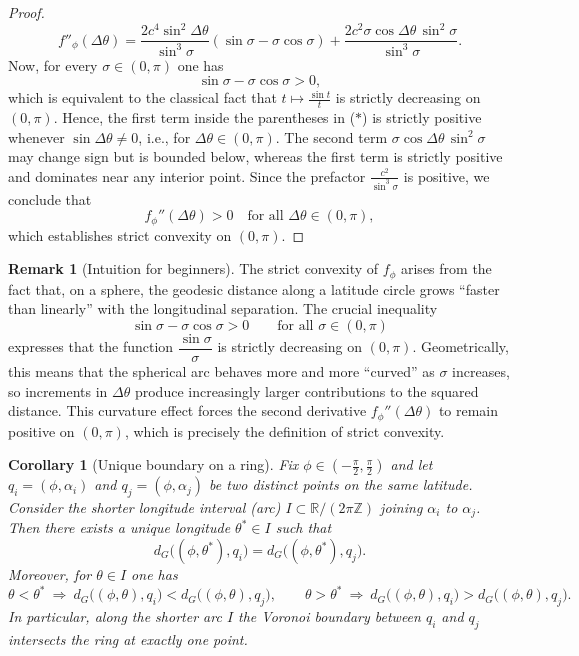 \documentclass[12pt, reqno]{amsart}
\theoremstyle{plain}
\newtheorem{corollary}[subsection]{Corollary}
\theoremstyle{definition}
\newtheorem{remark}[subsection]{Remark}
\begin{document}
\begin{proof}
\begin{equation}
f''_\phi(\Delta\theta)
=
\frac{2c^{4}\sin^{2}\Delta\theta}{\sin^{3}\sigma}
(\sin\sigma - \sigma\cos\sigma)
+
\frac{2c^{2}\sigma\cos\Delta\theta\,\sin^{2}\sigma}{\sin^{3}\sigma}.
\tag{$\ast$}
\end{equation}
 Now, for every $\sigma \in (0,\pi)$ one has
\[
\sin\sigma - \sigma\cos\sigma > 0,
\]
which is equivalent to the classical fact that $t \mapsto \frac{\sin t}{t}$ is strictly decreasing on $(0,\pi)$.
Hence, the first term inside the parentheses in \textup{($\ast$)} is strictly positive whenever $\sin\Delta\theta \neq 0$, i.e., for $\Delta\theta \in (0,\pi)$.
The second term $\sigma\cos\Delta\theta\,\sin^{2}\sigma$ may change sign but is bounded below, whereas the first term is strictly positive and dominates near any interior point.
Since the prefactor $\frac{c^{2}}{\sin^{3}\sigma}$ is positive, we conclude that
\[
f_{\phi}''(\Delta\theta) > 0 \quad \text{for all } \Delta\theta \in (0,\pi),
\]
which establishes strict convexity on $(0,\pi)$.
\end{proof}

\begin{remark}[Intuition for beginners]
The strict convexity of $f_\phi$ arises from the fact that, on a sphere, the geodesic distance along a
latitude circle grows ``faster than linearly'' with the longitudinal separation. The crucial inequality
\[
\sin\sigma - \sigma\cos\sigma > 0 \qquad \text{for all } \sigma \in (0,\pi)
\]
expresses that the function $\dfrac{\sin \sigma}{\sigma}$ is strictly decreasing on $(0,\pi)$. Geometrically,
this means that the spherical arc behaves more and more ``curved'' as $\sigma$ increases, so increments
in $\Delta\theta$ produce increasingly larger contributions to the squared distance. This curvature effect
forces the second derivative $f_\phi''(\Delta\theta)$ to remain positive on $(0,\pi)$, which is precisely
the definition of strict convexity.
\end{remark}

\begin{corollary}[Unique boundary on a ring]\label{cor:ring-boundary}
Fix $\phi\in\left(-\frac{\pi}{2},\frac{\pi}{2}\right)$ and let 
$q_i=(\phi,\alpha_i)$ and $q_j=(\phi,\alpha_j)$ be two distinct points on the same latitude.
Consider the shorter longitude interval (arc) $I\subset \mathbb{R}/(2\pi\mathbb{Z})$ joining $\alpha_i$ to $\alpha_j$.
Then there exists a unique longitude $\theta^\ast\in I$ such that
\[
d_G\big((\phi,\theta^\ast),q_i\big)=d_G\big((\phi,\theta^\ast),q_j\big).
\]
Moreover, for $\theta\in I$ one has
\[
\theta<\theta^\ast \ \Longrightarrow\ d_G\big((\phi,\theta),q_i\big) < d_G\big((\phi,\theta),q_j\big),
\qquad
\theta>\theta^\ast \ \Longrightarrow\ d_G\big((\phi,\theta),q_i\big) > d_G\big((\phi,\theta),q_j\big).
\]
In particular, along the shorter arc $I$ the Voronoi boundary between $q_i$ and $q_j$ intersects the ring at exactly one point.
\end{corollary}
\end{document}
